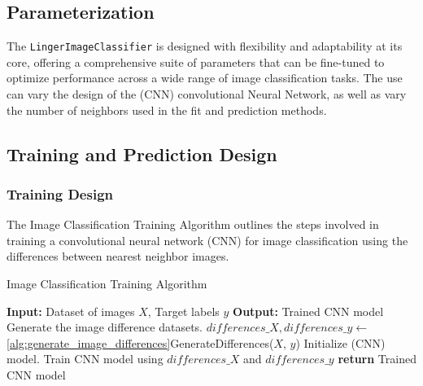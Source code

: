 \documentclass[a4paper, 12pt]{report}
\begin{document}
\subsection{Parameterization}
The \texttt{LingerImageClassifier} is designed with flexibility and adaptability at its core, offering a comprehensive suite of parameters that can be fine-tuned to optimize performance across a wide range of image classification tasks. 
The use can vary the design of the (CNN) convolutional Neural Network, as well as vary the number of neighbors used in the fit and prediction methods.
\subsection{Training and Prediction Design}
\subsubsection{Training Design}

The Image Classification Training Algorithm outlines the steps involved in training a convolutional neural network (CNN) for image 
classification using the differences between nearest neighbor images.

\begin{algorithm}
    \caption{Image Classification Training Algorithm}
    \label{alg:image_classification_training}
    \begin{algorithmic}
            \State \textbf{Input:} Dataset of images $X$, Target labels $y$
            \State \textbf{Output:} Trained CNN model
            \State Generate the image difference datasets.
            \State $differences\_X, differences\_y \gets$ \ref{alg:generate_image_differences}GenerateDifferences($X$, $y$) 
            \State Initialize (CNN) model. 
            \State Train CNN model using $differences\_X$ and $differences\_y$
            \State \textbf{return} Trained CNN model
        \EndFunction
    \end{algorithmic}
\end{algorithm}
\end{document}
